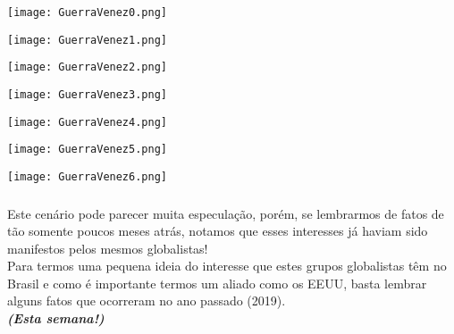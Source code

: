 \documentclass[aspectratio=169]{beamer}
\begin{document}
	\begin{frame}
	  \texttt{[image: GuerraVenez0.png]}
	\end{frame}
	
		\begin{frame}
	  \texttt{[image: GuerraVenez1.png]}
	\end{frame}
	
		\begin{frame}
	  \texttt{[image: GuerraVenez2.png]}
	\end{frame}
	
		\begin{frame}
	  \texttt{[image: GuerraVenez3.png]}
	\end{frame}
	
		\begin{frame}
	  \texttt{[image: GuerraVenez4.png]}
	\end{frame}
	
		\begin{frame}
	  \texttt{[image: GuerraVenez5.png]}
	\end{frame}
	
		\begin{frame}
	  \texttt{[image: GuerraVenez6.png]}
	\end{frame}


\begin{frame}
	  \frametitle{}
	  \framesubtitle{}
	    \centering
	  Este cenário pode parecer muita especulação, porém, se lembrarmos de fatos de tão somente poucos meses atrás, notamos que esses interesses já haviam sido manifestos pelos mesmos globalistas!\\
	  
		Para termos uma pequena ideia do interesse que estes grupos globalistas têm no Brasil e como é importante termos um aliado como os EEUU, basta lembrar alguns fatos que ocorreram no ano passado (2019).\\
\vspace{.5cm}
{\small \textit{\textbf{(Esta semana!)}}}
	\end{frame}
\end{document}
